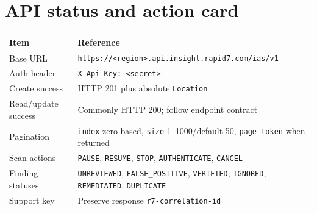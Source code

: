 \documentclass[11pt,letterpaper,oneside]{scrreprt}
\newcommand{\code}[1]{\texttt{#1}}
\begin{document}
\section{API status and action card}
\begin{tabularx}{\textwidth}{@{}P{1.4in}Y@{}}
\toprule
\textbf{Item} & \textbf{Reference}\\
\midrule
Base URL & \code{https://<region>.api.insight.rapid7.com/ias/v1}\\
Auth header & \code{X-Api-Key: <secret>}\\
Create success & HTTP 201 plus absolute \code{Location}\\
Read/update success & Commonly HTTP 200; follow endpoint contract\\
Pagination & \code{index} zero-based, \code{size} 1--1000/default 50, \code{page-token} when returned\\
Scan actions & \code{PAUSE}, \code{RESUME}, \code{STOP}, \code{AUTHENTICATE}, \code{CANCEL}\\
Finding statuses & \code{UNREVIEWED}, \code{FALSE\_\allowbreak POSITIVE}, \code{VERIFIED}, \code{IGNORED}, \code{REMEDIATED}, \code{DUPLICATE}\\
Support key & Preserve response \code{r7-correlation-id}\\
\bottomrule
\end{tabularx}
\end{document}
